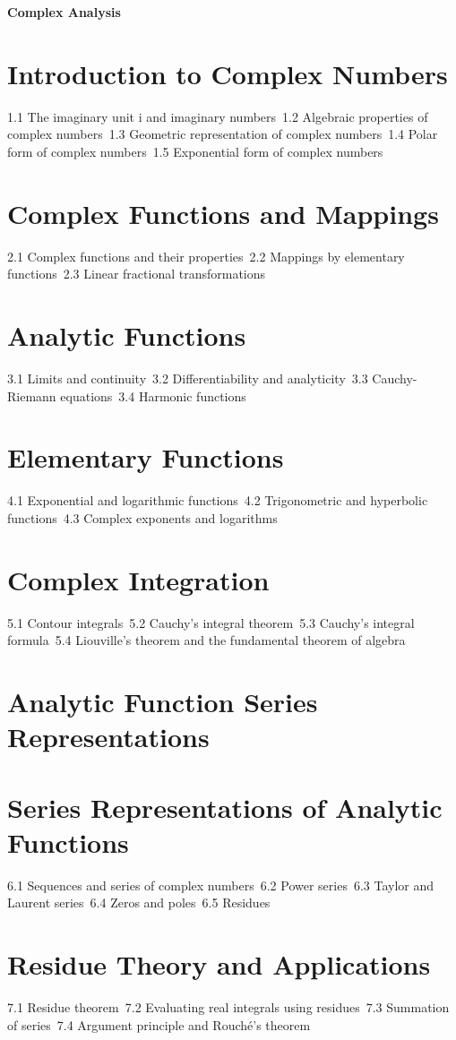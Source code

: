 {\LARGE \bf{Complex Analysis}}
\section{Introduction to Complex Numbers}
1.1 The imaginary unit i and imaginary numbers\
1.2 Algebraic properties of complex numbers\
1.3 Geometric representation of complex numbers\
1.4 Polar form of complex numbers\
1.5 Exponential form of complex numbers\
\section{Complex Functions and Mappings}
2.1 Complex functions and their properties\
2.2 Mappings by elementary functions\
2.3 Linear fractional transformations\
\section{Analytic Functions}
3.1 Limits and continuity\
3.2 Differentiability and analyticity\
3.3 Cauchy-Riemann equations\
3.4 Harmonic functions\
\section{Elementary Functions}
4.1 Exponential and logarithmic functions\
4.2 Trigonometric and hyperbolic functions\
4.3 Complex exponents and logarithms\
\section{Complex Integration}
5.1 Contour integrals\
5.2 Cauchy's integral theorem\
5.3 Cauchy's integral formula\
5.4 Liouville's theorem and the fundamental theorem of algebra\
\section{Analytic Function Series Representations}
\section{Series Representations of Analytic Functions}
6.1 Sequences and series of complex numbers\
6.2 Power series\
6.3 Taylor and Laurent series\
6.4 Zeros and poles\
6.5 Residues\
\section{Residue Theory and Applications}
7.1 Residue theorem\
7.2 Evaluating real integrals using residues\
7.3 Summation of series\
7.4 Argument principle and Rouché's theorem\
